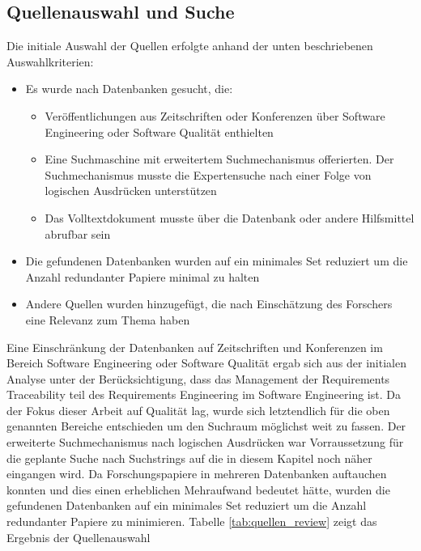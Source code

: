 
\subsection{Quellenauswahl und Suche}
\label{subsec:Quellenauswahl}

Die initiale Auswahl der Quellen erfolgte anhand der unten beschriebenen Auswahlkriterien:

\begin{itemize}
    \item Es wurde nach Datenbanken gesucht, die:
        \begin{itemize}
            \item Veröffentlichungen aus Zeitschriften oder Konferenzen über Software Engineering oder Software Qualität enthielten
            \item Eine Suchmaschine mit erweitertem Suchmechanismus offerierten. Der Suchmechanismus musste die Expertensuche nach einer Folge von logischen Ausdrücken unterstützen
            \item Das Volltextdokument musste über die Datenbank oder andere Hilfsmittel abrufbar sein
        \end{itemize}
    \item Die gefundenen Datenbanken wurden auf ein minimales Set reduziert um die Anzahl redundanter Papiere minimal zu halten
    \item Andere Quellen wurden hinzugefügt, die nach Einschätzung des Forschers eine Relevanz zum Thema haben
\end{itemize}

Eine Einschränkung der Datenbanken auf Zeitschriften und Konferenzen im Bereich Software Engineering oder Software Qualität ergab sich aus der initialen Analyse unter der Berücksichtigung, dass das Management der Requirements Traceability teil des Requirements Engineering im Software Engineering ist. Da der Fokus dieser Arbeit auf Qualität lag, wurde sich letztendlich für die oben genannten Bereiche entschieden um den Suchraum möglichst weit zu fassen. Der erweiterte Suchmechanismus nach logischen Ausdrücken war Vorraussetzung für die geplante Suche nach Suchstrings auf die in diesem Kapitel noch näher eingangen wird. Da Forschungspapiere in mehreren Datenbanken auftauchen konnten und dies einen erheblichen Mehraufwand bedeutet hätte, wurden die gefundenen Datenbanken auf ein minimales Set reduziert um die Anzahl redundanter Papiere zu minimieren. Tabelle \ref{tab:quellen_review} zeigt das Ergebnis der Quellenauswahl

